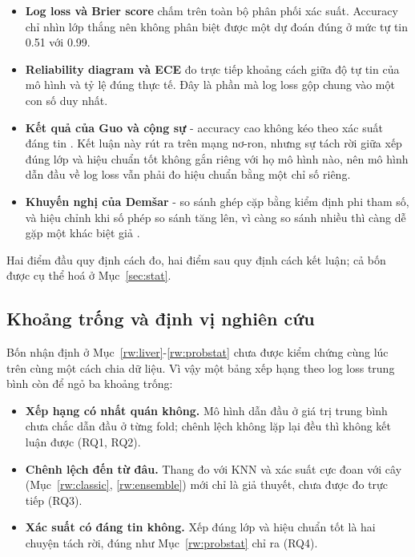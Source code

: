 \documentclass[12pt]{template/ai_conquer2026}
\begin{document}
\begin{itemize}
  \item \textbf{Log loss và Brier score} \cite{brier1950verification} chấm trên
        toàn bộ phân phối xác suất. Accuracy chỉ nhìn lớp thắng nên không phân biệt
        được một dự đoán đúng ở mức tự tin 0.51 với 0.99.
  \item \textbf{Reliability diagram và ECE} đo trực tiếp khoảng cách giữa độ tự tin
        của mô hình và tỷ lệ đúng thực tế. Đây là phần mà log loss gộp chung vào một con
        số duy nhất.
  \item \textbf{Kết quả của Guo và cộng sự} - accuracy cao không kéo theo xác suất
        đáng tin \cite{guo2017calibration}. Kết luận này rút ra trên mạng nơ-ron,
        nhưng sự tách rời giữa xếp đúng lớp và hiệu chuẩn tốt không gắn riêng với
        họ mô hình nào, nên mô hình dẫn đầu về log loss vẫn phải đo hiệu chuẩn
        bằng một chỉ số riêng.
  \item \textbf{Khuyến nghị của Demšar} - so sánh ghép cặp bằng kiểm định phi tham
        số, và hiệu chỉnh khi số phép so sánh tăng lên, vì càng so sánh nhiều thì
        càng dễ gặp một khác biệt giả \cite{demsar2006statistical}.
\end{itemize}

Hai điểm đầu quy định cách đo, hai điểm sau quy định cách kết luận; cả bốn được cụ
thể hoá ở Mục~\ref{sec:stat}.

\subsection{Khoảng trống và định vị nghiên cứu}

Bốn nhận định ở Mục~\ref{rw:liver}-\ref{rw:probstat} chưa được kiểm chứng cùng lúc
trên cùng một cách chia dữ liệu. Vì vậy một bảng xếp hạng theo log loss trung bình
còn để ngỏ ba khoảng trống:

\begin{itemize}
\item \textbf{Xếp hạng có nhất quán không.} Mô hình dẫn đầu ở giá trị trung bình
chưa chắc dẫn đầu ở từng fold; chênh lệch không lặp lại đều thì không kết luận
được (RQ1, RQ2).
\item \textbf{Chênh lệch đến từ đâu.} Thang đo với KNN và xác suất cực đoan với
cây (Mục~\ref{rw:classic}, \ref{rw:ensemble}) mới chỉ là giả thuyết, chưa được đo
trực tiếp (RQ3).
\item \textbf{Xác suất có đáng tin không.} Xếp đúng lớp và hiệu chuẩn tốt là hai
chuyện tách rời, đúng như Mục~\ref{rw:probstat} chỉ ra (RQ4).
\end{itemize}
\end{document}
